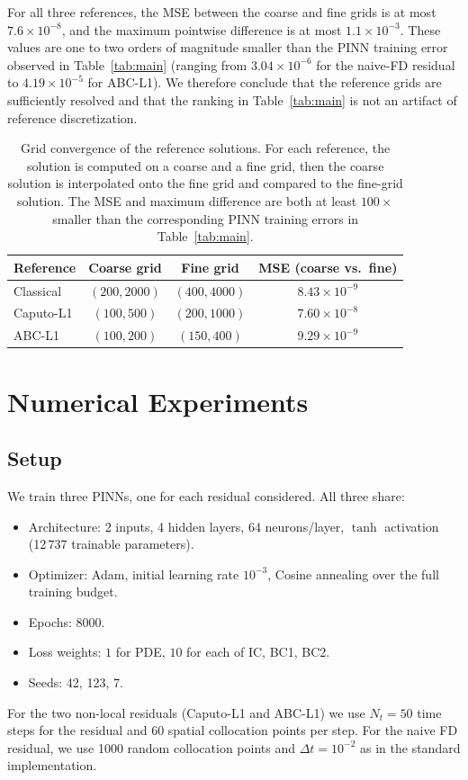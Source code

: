 \documentclass[11pt]{article}
\begin{document}
For all three references, the MSE between the coarse and fine grids
is at most \(7.6\times 10^{-8}\), and the maximum pointwise difference
is at most \(1.1\times 10^{-3}\). These values are one to two orders
of magnitude smaller than the PINN training error observed in
Table~\ref{tab:main} (ranging from \(3.04\times 10^{-6}\) for the
naive-FD residual to \(4.19\times 10^{-5}\) for ABC-L1). We therefore
conclude that the reference grids are sufficiently resolved and that
the ranking in Table~\ref{tab:main} is not an artifact of reference
discretization.

\begin{table}[h]
\centering
\caption{Grid convergence of the reference solutions. For each
         reference, the solution is computed on a coarse and a fine
         grid, then the coarse solution is interpolated onto the fine
         grid and compared to the fine-grid solution. The MSE and
         maximum difference are both at least \(100\times\) smaller
         than the corresponding PINN training errors in
         Table~\ref{tab:main}.}
\label{tab:grid_convergence}
\begin{tabular}{lccc}
\toprule
Reference & Coarse grid & Fine grid & MSE (coarse vs.\ fine) \\
\midrule
Classical & \((200, 2000)\) & \((400, 4000)\) & \(8.43\times 10^{-9}\) \\
Caputo-L1 & \((100, 500)\)  & \((200, 1000)\) & \(7.60\times 10^{-8}\) \\
ABC-L1    & \((100, 200)\)  & \((150, 400)\)  & \(9.29\times 10^{-9}\) \\
\bottomrule
\end{tabular}
\end{table}

\section{Numerical Experiments}
\label{sec:results}

\subsection{Setup}

We train three PINNs, one for each residual considered. All three share:
\begin{itemize}
\item Architecture: 2 inputs, 4 hidden layers, 64 neurons/layer, \(\tanh\) activation (12\,737 trainable parameters).
\item Optimizer: Adam, initial learning rate \(10^{-3}\), Cosine annealing over the full training budget.
\item Epochs: 8000.
\item Loss weights: \(1\) for PDE, \(10\) for each of IC, BC1, BC2.
\item Seeds: 42, 123, 7.
\end{itemize}
For the two non-local residuals (Caputo-L1 and ABC-L1) we use \(N_t=50\) time steps for the residual and \(60\) spatial collocation points per step. For the naive FD residual, we use 1000 random collocation points and \(\Delta t = 10^{-2}\) as in the standard implementation.
\end{document}
